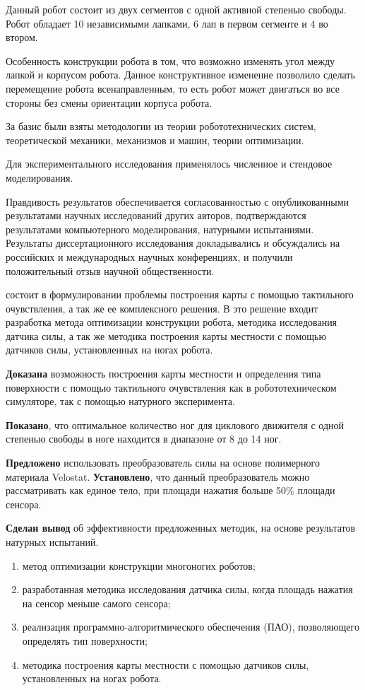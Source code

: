 Данный робот состоит из двух сегментов с одной активной степенью свободы. Робот обладает 10 независимыми лапками, 6 лап в первом сегменте и 4 во втором.

Особенность конструкции робота в том, что возможно изменять угол между лапкой и корпусом робота. Данное конструктивное изменение позволило сделать перемещение робота всенаправленным, то есть робот может двигаться во все стороны без смены ориентации корпуса робота.


{\methods} За базис были взяты методологии из теории робототехнических систем, теоретической механики, механизмов и машин, теории оптимизации.

Для экспериментального исследования применялось численное и стендовое моделирования.

{\reliability} Правдивость результатов обеспечивается согласованностью с опубликованными результатами научных исследований других авторов, подтверждаются результатами компьютерного моделирования, натурными испытаниями. Результаты диссертационного исследования докладывались и обсуждались на российских и международных научных конференциях, и получили положительный отзыв научной общественности.


{\novelty} состоит в формулировании проблемы построения карты с помощью тактильного очувствления, а так же ее комплексного решения. В это решение входит разработка метода оптимизации конструкции робота, методика исследования датчика силы, а так же методика построения карты местности с помощью датчиков силы, установленных на ногах робота.

\textbf{Доказана} возможность построения карты местности и определения типа поверхности с помощью тактильного очувствления как в робототехническом симуляторе, так с помощью натурного эксперимента.

\textbf{Показано}, что оптимальное количество ног для циклового движителя с одной степенью свободы в ноге находится в диапазоне от 8 до 14 ног. 

\textbf{Предложено} использовать преобразователь силы на основе полимерного материала Velostat. \textbf{Установлено}, что данный преобразователь можно рассматривать как единое тело, при площади нажатия больше 50\% площади сенсора. 

\textbf{Сделан вывод} об эффективности предложенных методик, на основе результатов натурных испытаний.

{}
\begin{enumerate}[beginpenalty=10000] %
  \item метод оптимизации конструкции многоногих роботов;
  \item разработанная методика исследования датчика силы, когда площадь нажатия на сенсор меньше самого сенсора;
  \item реализация программно-алгоритмического обеспечения (ПАО), позволяющего определять тип поверхности;
  \item методика построения карты местности с помощью датчиков силы, установленных на ногах робота.
\end{enumerate}


